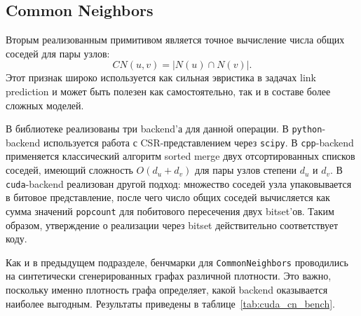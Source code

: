 \documentclass[a4paper,12pt]{extarticle}
\begin{document}
  \subsection{Common Neighbors}

  Вторым реализованным примитивом является точное вычисление числа общих соседей для пары узлов:
  \[
  CN(u,v)=|N(u)\cap N(v)|.
  \]
  Этот признак широко используется как сильная эвристика в задачах link prediction и может быть полезен как самостоятельно, так и в составе более сложных моделей.

  В библиотеке реализованы три backend'а для данной операции. В \texttt{python}-backend используется работа с CSR-представлением через \texttt{scipy}. В
  \texttt{cpp}-backend применяется классический алгоритм sorted merge двух отсортированных списков соседей, имеющий сложность $O(d_u+d_v)$ для пары узлов степени
  $d_u$ и $d_v$. В \texttt{cuda}-backend реализован другой подход: множество соседей узла упаковывается в битовое представление, после чего число общих соседей
  вычисляется как сумма значений \texttt{popcount} для побитового пересечения двух bitset'ов. Таким образом, утверждение о реализации через bitset действительно
  соответствует коду.

  Как и в предыдущем подразделе, бенчмарки для \texttt{CommonNeighbors} проводились на синтетически сгенерированных графах различной плотности. Это важно, поскольку
  именно плотность графа определяет, какой backend оказывается наиболее выгодным. Результаты приведены в таблице~\ref{tab:cuda_cn_bench}.
\end{document}
